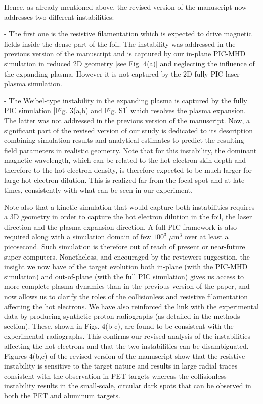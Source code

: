 \documentclass[aps,showpacs,superscriptaddress]{revtex4}%
\begin{document}
\begin{enumerate}
Hence, as already mentioned above, the revised version of the manuscript now addresses two different instabilities:

- The first one is the resistive filamentation which is expected to drive magnetic fields inside the dense part of the foil. The instability was addressed in the previous version of the manuscript and is captured by our in-plane PIC-MHD simulation in reduced 2D geometry [see Fig. 4(a)] and neglecting the influence of the expanding plasma. However it is not captured by the 2D fully PIC laser-plasma simulation.

- The Weibel-type instability    in the expanding plasma is    captured by the fully PIC simulation [Fig. 3(a,b) and Fig. S1]  which resolves the plasma expansion.
 The latter was not addressed in the previous version of the manuscript. Now, a significant part of the revised version of our study is dedicated to its description combining simulation results and analytical estimates to predict the resulting field parameters in realistic geometry.
Note that for this instability,  the dominant magnetic wavelength, which can  be related to the hot electron skin-depth and therefore to the hot electron density, is therefore expected to be much larger for large hot electron dilution. 
This is realized far from the focal spot and at late times, consistently with what can be seen in our experiment.

Note also that a kinetic simulation that would capture both instabilities requires a 3D geometry in order to capture the hot electron dilution in the foil, the laser direction and the plasma expansion direction.  A full-PIC framework is also required along with a simulation domain of  few   $100^3$ $\mu$m$^3$   over at least a picosecond. Such simulation is therefore out of reach of present or near-future super-computers.
Nonetheless, and encouraged by the reviewers suggestion, the insight we now have of the target evolution both in-plane (with the PIC-MHD simulation) and out-of-plane (with the full PIC simulation) gives us access to more complete plasma dynamics than in the previous version of the paper, and now allows us to clarify the roles of the collisionless and resistive filamentation affecting the hot electrons.
We have also reinforced the link with the experimental data by producing synthetic proton radiographs (as detailed in the methods section). These, shown in Figs. 4(b-c), are found to be consistent with the experimental radiographs. This confirms  our revised analysis of the instabilities affecting the hot electrons and that the two instabilities can be disambiguated.  Figures 4(b,c) of  the revised version of the manuscript show that the resistive instability is sensitive to the target nature and results in large radial traces consistent with the observation in PET targets whereas  the collisionless instability  results in the small-scale, circular dark spots  that can be observed in both the PET and aluminum targets.

\end{enumerate}
\end{document}
